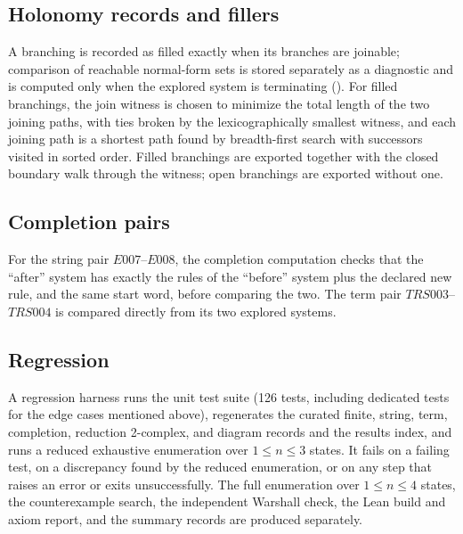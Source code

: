 \subsection{Holonomy records and fillers}

A branching is recorded as filled exactly when its branches are joinable; comparison of reachable normal-form sets is stored separately as a diagnostic and is computed only when the explored system is terminating (). For filled branchings, the join witness is chosen to minimize the total length of the two joining paths, with ties broken by the lexicographically smallest witness, and each joining path is a shortest path found by breadth-first search with successors visited in sorted order. Filled branchings are exported together with the closed boundary walk through the witness; open branchings are exported without one.

\subsection{Completion pairs}

For the string pair $E007$--$E008$, the completion computation checks that the ``after'' system has exactly the rules of the ``before'' system plus the declared new rule, and the same start word, before comparing the two. The term pair $TRS003$--$TRS004$ is compared directly from its two explored systems.

\subsection{Regression}

A regression harness runs the unit test suite (126 tests, including dedicated tests for the edge cases mentioned above), regenerates the curated finite, string, term, completion, reduction 2-complex, and diagram records and the results index, and runs a reduced exhaustive enumeration over $1 \le n \le 3$ states. It fails on a failing test, on a discrepancy found by the reduced enumeration, or on any step that raises an error or exits unsuccessfully. The full enumeration over $1 \le n \le 4$ states, the counterexample search, the independent Warshall check, the Lean build and axiom report, and the summary records are produced separately.
